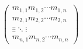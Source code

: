 $
      \begin{pmatrix}
      m_{1,1}  m_{1,2}  \cdots  m_{1,n} \\
      m_{2,1}  m_{2,2}  \cdots  m_{2,n} \\
      \vdots   \vdots   \ddots  \vdots  \\
      m_{n,1}  m_{n,2}  \cdots  m_{n,n}
      \end{pmatrix}
$
